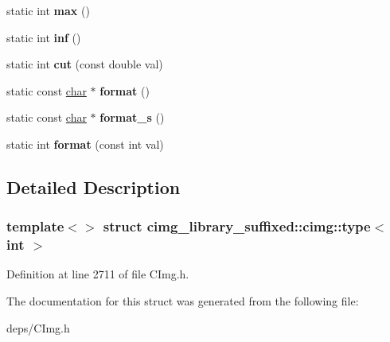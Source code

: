 \begin{DoxyCompactItemize}
static int {\bfseries max} ()
\item 
\mbox{\label{structcimg__library__suffixed_1_1cimg_1_1type_3_01int_01_4_abd4229c9635ead67c13026ec085460d0}} 
static int {\bfseries inf} ()
\item 
\mbox{\label{structcimg__library__suffixed_1_1cimg_1_1type_3_01int_01_4_ab523c5c5c529a47f19ca9588b0cd33c7}} 
static int {\bfseries cut} (const double val)
\item 
\mbox{\label{structcimg__library__suffixed_1_1cimg_1_1type_3_01int_01_4_a302c66c324e6bd00692c81abcfdf2269}} 
static const \hyperlink{classchar}{char} $\ast$ {\bfseries format} ()
\item 
\mbox{\label{structcimg__library__suffixed_1_1cimg_1_1type_3_01int_01_4_ac06eba8b48b9f967422a033b445b4c44}} 
static const \hyperlink{classchar}{char} $\ast$ {\bfseries format\+\_\+s} ()
\item 
\mbox{\label{structcimg__library__suffixed_1_1cimg_1_1type_3_01int_01_4_abee56144fccb01cdf6bf6d183b1f966a}} 
static int {\bfseries format} (const int val)
\end{DoxyCompactItemize}


\subsection{Detailed Description}
\subsubsection*{template$<$$>$\newline
struct cimg\+\_\+library\+\_\+suffixed\+::cimg\+::type$<$ int $>$}



Definition at line 2711 of file C\+Img.\+h.



The documentation for this struct was generated from the following file\+:\begin{DoxyCompactItemize}
\item 
deps/C\+Img.\+h\end{DoxyCompactItemize}
